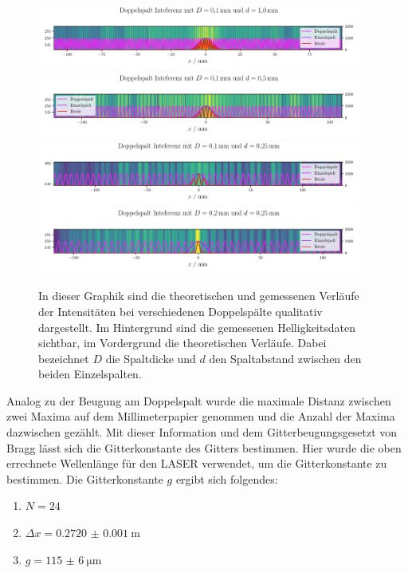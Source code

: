 \documentclass[12pt,english,ngerman]{scrartcl}
\begin{document}
\begin{figure}[H]
	\centering
	\includegraphics[width=0.95\textwidth]{figures/intensity_1.pdf}
	\includegraphics[width=0.95\textwidth]{figures/intensity_2.pdf}
	\includegraphics[width=0.95\textwidth]{figures/intensity_3.pdf}
	\includegraphics[width=0.95\textwidth]{figures/intensity_4.pdf}
	\caption{In dieser Graphik sind die theoretischen und
  gemessenen Verläufe der Intensitäten bei verschiedenen Doppelspälte 
  qualitativ dargestellt. Im Hintergrund sind die gemessenen 
  Helligkeitsdaten sichtbar, im Vordergrund die theoretischen Verläufe.
Dabei bezeichnet $D$ die Spaltdicke und 
$d$ den Spaltabstand zwischen den beiden Einzelspalten.}\label{fig:auswertung_intensity}
\end{figure}

Analog zu der Beugung am Doppelspalt wurde die maximale Distanz zwischen zwei
Maxima auf dem Millimeterpapier genommen und die Anzahl der Maxima dazwischen gezählt. Mit
dieser Information und dem Gitterbeugungsgesetzt von Bragg lässt sich die
Gitterkonstante des Gitters bestimmen. Hier wurde die oben errechnete
Wellenlänge für den LASER verwendet, um die Gitterkonstante zu bestimmen. Die
Gitterkonstante $g$ ergibt sich folgendes:

\begin{enumerate}
	\item $N = \num{24}$
	\item $\Delta x = \SI{0.2720(10)}{\m}$
	\item $g = \SI{115(6)}{\um}$
\end{enumerate}
\end{document}
